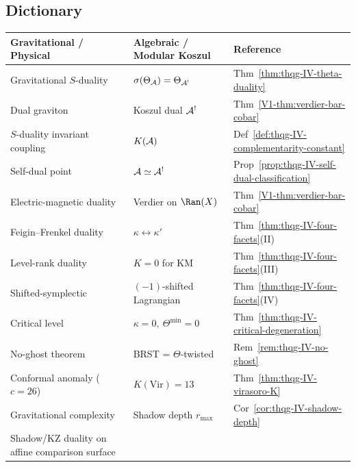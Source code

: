 %
%

\subsection{Dictionary}

\begin{center}
\renewcommand{\arraystretch}{1.5}
\begin{tabular}{|>{\raggedright\arraybackslash}p{5.5cm}|%
 >{\raggedright\arraybackslash}p{5.5cm}|%
 >{\raggedright\arraybackslash}p{3cm}|}
\hline
\textbf{Gravitational / Physical} &
\textbf{Algebraic / Modular Koszul} & \textbf{Reference} \\
\hline\hline
Gravitational $S$-duality &
$\sigma(\Theta_{\mathcal{A}}) = \Theta_{\mathcal{A}^!}$ & Thm~\ref{thm:thqg-IV-theta-duality} \\
\hline
Dual graviton & Koszul dual $\mathcal{A}^!$ & Thm~\ref*{V1-thm:verdier-bar-cobar} \\
\hline
$S$-duality invariant coupling &
$K(\mathcal{A})$ & Def~\ref{def:thqg-IV-complementarity-constant} \\
\hline
Self-dual point & $\mathcal{A} \simeq \mathcal{A}^!$ &
Prop~\ref{prop:thqg-IV-self-dual-classification} \\
\hline
Electric-magnetic duality &
Verdier on $\Ran(X)$ & Thm~\ref*{V1-thm:verdier-bar-cobar} \\
\hline
Feigin--Frenkel duality &
$\kappa \leftrightarrow \kappa'$ & Thm~\ref{thm:thqg-IV-four-facets}(II) \\
\hline
Level-rank duality & $K = 0$ for KM &
Thm~\ref{thm:thqg-IV-four-facets}(III) \\
\hline
Shifted-symplectic &
$(-1)$-shifted Lagrangian & Thm~\ref{thm:thqg-IV-four-facets}(IV) \\
\hline
Critical level & $\kappa = 0,\ \Theta^{\min}=0$ &
Thm~\ref{thm:thqg-IV-critical-degeneration} \\
\hline
No-ghost theorem & BRST = $\Theta$-twisted &
Rem~\ref{rem:thqg-IV-no-ghost} \\
\hline
Conformal anomaly ($c = 26$) &
$K(\mathrm{Vir}) = 13$ & Thm~\ref{thm:thqg-IV-virasoro-K} \\
\hline
Gravitational complexity &
Shadow depth $r_{\max}$ & Cor~\ref{cor:thqg-IV-shadow-depth} \\
\hline
Shadow/KZ duality on affine comparison surface &

\end{tabular}
\end{center}
